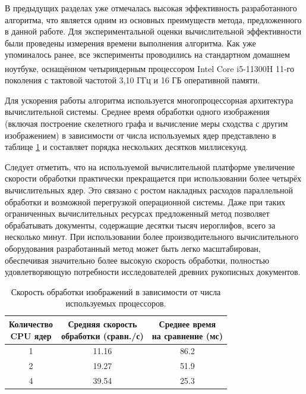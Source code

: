 В предыдущих разделах уже отмечалась высокая эффективность разработанного алгоритма, что является одним из основных преимуществ метода, предложенного в данной работе. Для экспериментальной оценки вычислительной эффективности были проведены измерения времени выполнения алгоритма. Как уже упоминалось ранее, все эксперименты проводились на стандартном домашнем ноутбуке, оснащённом четыриядерным процессором Intel\textsuperscript{\textregistered} Core\textsuperscript{\texttrademark} i5-11300H 11-го поколения с тактовой частотой 3,10 ГГц и 16 ГБ оперативной памяти.

Для ускорения работы алгоритма используется многопроцессорная архитектура вычислительной системы. Среднее время обработки одного изображения (включая построение скелетного графа и вычисление меры сходства с другим изображением) в зависимости от числа используемых ядер представлено в таблице \cref{tab:speed_1} и составляет порядка нескольких десятков миллисекунд.

Следует отметить, что на используемой вычислительной платформе увеличение скорости обработки практически прекращается при использовании более четырёх вычислительных ядер. Это связано с ростом накладных расходов параллельной обработки и возможной перегрузкой операционной системы. Даже при таких ограниченных вычислительных ресурсах предложенный метод позволяет обрабатывать документы, содержащие десятки тысяч иероглифов, всего за несколько минут. При использовании более производительного вычислительного оборудования разработанный метод может быть легко масштабирован, обеспечивая значительно более высокую скорость обработки, полностью удовлетворяющую потребности исследователей древних рукописных документов.

\begin{table}[!htbp]
    \centering
    \captionsetup{justification=centering} %
    \caption{Скорость обработки изображений в зависимости от числа используемых процессоров.}\label{tab:speed_1}
    \begin{tabular}{ccc}
        \hline
        \makecell[c]{Количество       \\CPU ядер} &
        \makecell[c]{Средняя скорость \\обработки (сравн./с)} &
        \makecell[c]{Среднее время    \\на сравнение (мс)} \\
        \hline
        1 & 11.16 & 86.2              \\
        2 & 19.27 & 51.9              \\
        4 & 39.54 & 25.3              \\
        \hline
    \end{tabular}
\end{table}

